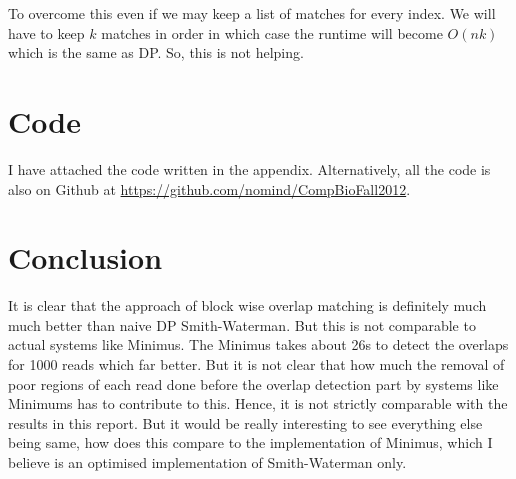 \documentclass{article}
\begin{document}
            To overcome this even if we may keep a list of matches for every index. We will have to keep $k$ matches in order in which case the runtime will become $O(nk)$ which is the same as DP. So, this is not helping.

    \section{Code}
    
        I have attached the code written in the appendix. Alternatively, all the code is also on Github at \url{https://github.com/nomind/CompBioFall2012}.
        
    \section{Conclusion}
        
        It is clear that the approach of block wise overlap matching is definitely much much better than naive DP Smith-Waterman. But this is not comparable to actual systems like Minimus. The Minimus takes about 26s to detect the overlaps for 1000 reads which far better. But it is not clear that how much the removal of poor regions of each read done before the overlap detection part by systems like Minimums has to contribute to this. Hence, it is not strictly comparable with the results in this report. But it would be really interesting to see everything else being same, how does this compare to the implementation of Minimus, which I believe is an optimised implementation of Smith-Waterman only.
        
\end{document}
